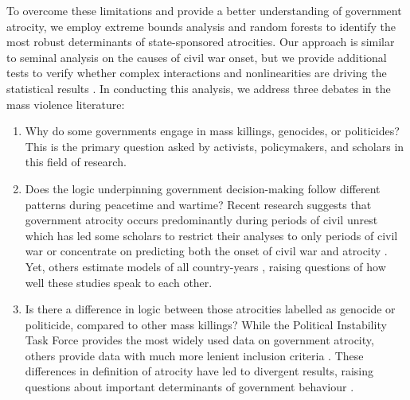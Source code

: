 \documentclass[a4paper,12pt]{article}
\begin{document}
To overcome these limitations and provide a better understanding of government atrocity, we employ extreme bounds analysis and random forests to identify the most robust determinants of state-sponsored atrocities. Our approach is similar to \cite{hegre2006sensitivity} seminal analysis on the causes of civil war onset, but we provide additional tests to verify whether complex interactions and nonlinearities are driving the statistical results \citep{bell2015examining,jones2015exploratory,jones2018there,muchlinski2015comparing}. In conducting this analysis, we address three debates in the mass violence literature:
	
\begin{enumerate}
 \item Why do some governments engage in mass killings, genocides, or politicides? This is the primary question asked by activists, policymakers, and scholars in this field of research. 
 \item Does the logic underpinning government decision-making follow different patterns during peacetime and wartime? Recent research suggests that government atrocity occurs predominantly during periods of civil unrest \citep{harff2003no} which has led some scholars to restrict their analyses to only periods of civil war \citep[e.g.,][]{colaresi2008kill, valentino2004draining} or concentrate on predicting both the onset of civil war and atrocity \citep{goldsmith2013forecasting}. Yet, others estimate models of all country-years \citep[e.g.,][]{krain1997state, montalvo2008discrete}, raising questions of how well these studies speak to each other.
 \item Is there a difference in logic between those atrocities labelled as genocide or politicide, compared to other mass killings? While the Political Instability Task Force \citep{marshall2017pitf} provides the most widely used data on government atrocity, others provide data with much more lenient inclusion criteria \citep[e.g.,][]{stanton2015regulating, ulfelder2012forecasting}. These differences in definition of atrocity have led to divergent results, raising questions about important determinants of government behaviour \citep[for discussion, see][]{straus2007second, uzonyi2016domestic, wayman2010explaining}.
\end{enumerate}
\end{document}
